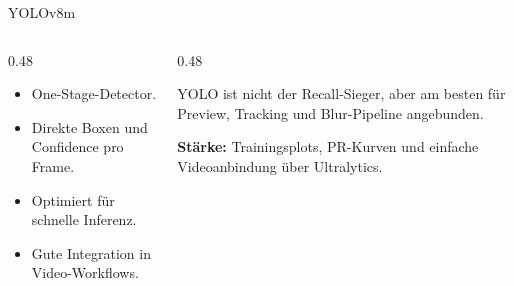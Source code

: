 \begin{frame}{YOLOv8m}
\small
\begin{columns}[T,onlytextwidth]
\begin{column}{0.48\textwidth}
\begin{itemize}
    \item One-Stage-Detector.
    \item Direkte Boxen und Confidence pro Frame.
    \item Optimiert für schnelle Inferenz.
    \item Gute Integration in Video-Workflows.
\end{itemize}
\end{column}
\begin{column}{0.48\textwidth}
\begin{mynote}[Projektbefund]
\small
YOLO ist nicht der Recall-Sieger, aber am besten für Preview, Tracking und Blur-Pipeline angebunden.
\end{mynote}
\vspace{0.4em}
\scriptsize
\textbf{Stärke:} Trainingsplots, PR-Kurven und einfache Videoanbindung über Ultralytics.
\end{column}
\end{columns}
\end{frame}
